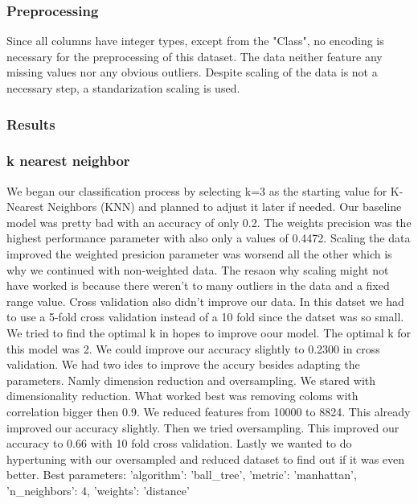 \documentclass{article}
\begin{document}
\subsubsection{Preprocessing}
Since all columns have integer types, except from the "Class", no encoding is necessary for the preprocessing of this dataset. The data neither feature any missing values nor any obvious outliers. Despite scaling of the data is not a necessary step, a standarization scaling is used.


\subsubsection{Results}
\subsubsection*{k nearest neighbor}
We began our classification process by selecting k=3 as the starting value for K-Nearest Neighbors (KNN) and planned to adjust it later if needed. Our baseline model was pretty bad with an accuracy of only 0.2. The weights precision was the highest performance parameter with also only a values of 0.4472. Scaling the data improved the weighted presicion parameter was worsend all the other which is why we continued with non-weighted data. The resaon why scaling might not have worked is because there weren't to many outliers in the data and a fixed range value. Cross validation also didn't improve our data. In this datset we had to use a 5-fold cross validation instead of a 10 fold since the datset was so small. 
We tried to find the optimal k in hopes to improve oour model. The optimal k for this model was 2. We could improve our accuracy slightly to 0.2300 in cross validation. We had two ides to improve the accury besides adapting the parameters. Namly dimension reduction and oversampling. 
We stared with dimensionality reduction. What worked best was removing coloms with correlation bigger then 0.9. We reduced features from 10000 to 8824. This already improved our accuracy slightly. Then we tried oversampling. This improved our accuracy  to 0.66 with 10 fold cross validation. Lastly we wanted to do hypertuning with our oversampled and reduced dataset to find out if it was even better.
Best parameters: {'algorithm': 'ball\_tree', 'metric': 'manhattan', 'n_neighbors': 4, 'weights': 'distance'}
\end{document}
